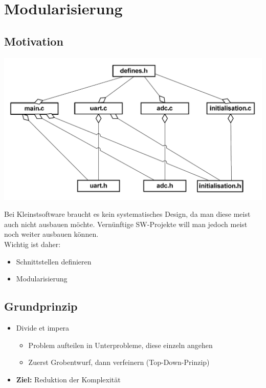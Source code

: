 \section{Modularisierung}
\subsection{Motivation }
\begin{minipage}{0.4\textwidth}
{\includegraphics[width=\textwidth]{images/Modularisierung/SchlechtesBeispielModularisierung.png}}
\end{minipage}
\hspace{0.05\textwidth}
\begin{minipage}{0.5\textwidth}
	Bei Kleinstsoftware braucht es kein systematisches Design, da man diese meist
	auch nicht ausbauen möchte. Vernünftige SW-Projekte will man jedoch meist noch
	weiter ausbauen können.\\
	Wichtig ist daher:
	\begin{itemize}
  	\item Schnittstellen definieren
  	\item Modularisierung
	\end{itemize}
\end{minipage}

\subsection{Grundprinzip}
\begin{itemize}
  \item Divide et impera
  \begin{itemize}
    \item Problem aufteilen in Unterprobleme, diese einzeln angehen
    \item Zuerst Grobentwurf, dann verfeinern (Top-Down-Prinzip)
  \end{itemize}
  \item \textbf{Ziel:} Reduktion der Komplexität
\end{itemize}
